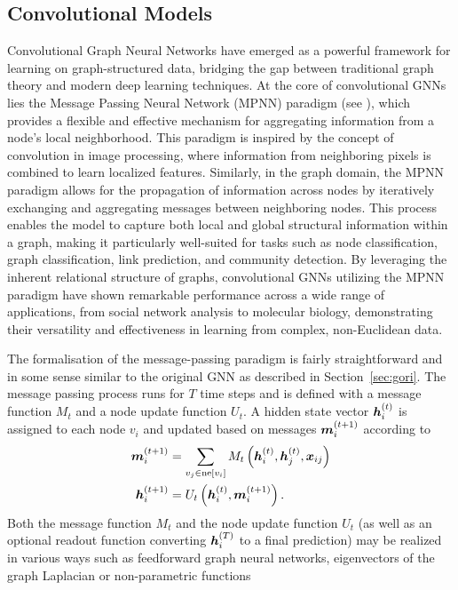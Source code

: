 \subsection{Convolutional Models}

Convolutional Graph Neural Networks have emerged as a powerful framework for learning on graph-structured data, bridging the gap between traditional graph theory and modern deep learning techniques. At the core of convolutional GNNs lies the Message Passing Neural Network (MPNN) paradigm (see \cite{gilmer_neural_2017}), which provides a flexible and effective mechanism for aggregating information from a node's local neighborhood. This paradigm is inspired by the concept of convolution in image processing, where information from neighboring pixels is combined to learn localized features. Similarly, in the graph domain, the MPNN paradigm allows for the propagation of information across nodes by iteratively exchanging and aggregating messages between neighboring nodes. This process enables the model to capture both local and global structural information within a graph, making it particularly well-suited for tasks such as node classification, graph classification, link prediction, and community detection. By leveraging the inherent relational structure of graphs, convolutional GNNs utilizing the MPNN paradigm have shown remarkable performance across a wide range of applications, from social network analysis to molecular biology, demonstrating their versatility and effectiveness in learning from complex, non-Euclidean data.

The formalisation of the message-passing paradigm is fairly straightforward and in some sense similar to the original GNN as described in Section~\ref{sec:gori}. The message passing process runs for \( T \) time steps and is defined with a message function \( M_t \) and a node update function \( U_t \). A hidden state vector \( \bm{h}_i^{(t)} \) is assigned to each node \( v_i \) and updated based on messages \( \bm{m}_i^{(t+1)} \) according to
\begin{equation}\label{eq:message-passing}
	\begin{split}
		\bm{m}_i^{(t+1)} &= \sum_{v_j \in \mathrm{ne}[v_i]} M_t \left( \bm{h}_i^{(t)}, \bm{h}_j^{(t)}, \bm{x}_{ij} \right) \\
		\bm{h}_i^{(t+1)} &= U_t \left( \bm{h}_i^{(t)}, \bm{m}_i^{(t+1)} \right). \\
	\end{split}
\end{equation}
Both the message function \( M_t \) and the node update function \( U_t \) (as well as an optional readout function converting \( \bm{h}_i^{(T)} \) to a final prediction) may be realized in various ways such as feedforward graph neural networks, eigenvectors of the graph Laplacian or non-parametric functions

